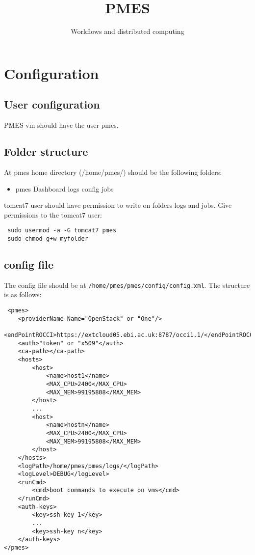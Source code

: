\documentclass[a4paper,10pt]{article}
\title{PMES}
\author{Workflows and distributed computing}
\begin{document}
\maketitle

\section{Configuration}
\subsection{User configuration}
PMES vm should have the user pmes.

\subsection{Folder structure}
At pmes home directory (/home/pmes/) should be the following folders:
\begin{itemize}
\item pmes
 \subitem Dashboard
 \subitem logs
 \subitem config
 \subitem jobs
\end{itemize}

tomcat7 user should have permission to write on folders logs and jobs.
Give permissions to the tomcat7 user:
\begin{verbatim}
 sudo usermod -a -G tomcat7 pmes
 sudo chmod g+w myfolder
\end{verbatim}

\subsection{config file}
The config file should be at \texttt{/home/pmes/pmes/config/config.xml}. The structure is as follows:

\begin{verbatim}
 <pmes>
    <providerName Name="OpenStack" or "One"/>
    <endPointROCCI>https://extcloud05.ebi.ac.uk:8787/occi1.1/</endPointROCCI>
    <auth>"token" or "x509"</auth>
    <ca-path></ca-path>
    <hosts>
        <host>
            <name>host1</name>
            <MAX_CPU>2400</MAX_CPU>
            <MAX_MEM>99195808</MAX_MEM>
        </host>
        ...
        <host>
            <name>hostn</name>
            <MAX_CPU>2400</MAX_CPU>
            <MAX_MEM>99195808</MAX_MEM>
        </host>
    </hosts>
    <logPath>/home/pmes/pmes/logs/</logPath>
    <logLevel>DEBUG</logLevel>
    <runCmd>
        <cmd>boot commands to execute on vms</cmd>
    </runCmd>
    <auth-keys>
        <key>ssh-key 1</key>
        ...
        <key>ssh-key n</key>
    </auth-keys>
</pmes>
\end{verbatim}
\end{document}
